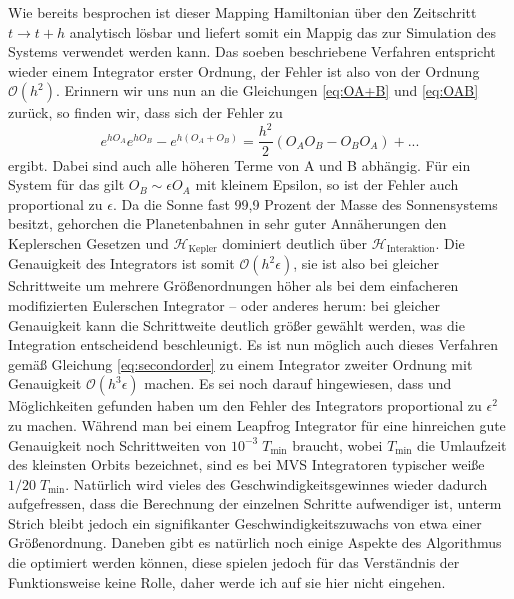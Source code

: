 \documentclass[12pt,a4paper,twoside]{article}
\renewcommand{\cite}{\citep}
\renewcommand{\H}{\mathcal H}
\begin{document}
Wie bereits besprochen ist dieser Mapping Hamiltonian über den Zeitschritt $t \to t+h$ analytisch lösbar und liefert somit ein Mappig das zur Simulation des Systems verwendet werden kann.
Das soeben beschriebene Verfahren entspricht wieder einem Integrator erster Ordnung, der Fehler ist also von der Ordnung $\mathcal{O}(h^2)$.
Erinnern wir uns nun an die Gleichungen \ref{eq:OA+B} und \ref{eq:OAB} zurück, so finden wir, dass sich der Fehler zu
\begin{equation}
e^{hO_A}e^{hO_B}-e^{h\left(O_A+O_B\right)} = \frac{h^2}{2} \left( O_AO_B-O_BO_A \right) + ...
\end{equation}
ergibt. Dabei sind auch alle höheren Terme von A und B abhängig\cite{Chambers1999}. Für ein System für das gilt $O_B\sim\epsilon O_A$ mit kleinem Epsilon, so ist der Fehler auch proportional zu $\epsilon$.
Da die Sonne fast 99,9 Prozent der Masse des Sonnensystems besitzt, %
gehorchen die Planetenbahnen in sehr guter Annäherungen den Keplerschen Gesetzen und $\H_{\mathrm{Kepler}}$ dominiert deutlich über $\H_{\mathrm{Interaktion}}$. Die Genauigkeit des Integrators ist somit $\mathcal{O}(h^2\epsilon)$, sie ist also bei gleicher Schrittweite um mehrere Größenordnungen höher als bei dem einfacheren modifizierten Eulerschen Integrator – oder anderes herum: bei gleicher Genauigkeit kann die Schrittweite deutlich größer gewählt werden, was die Integration entscheidend beschleunigt.
Es ist nun möglich auch dieses Verfahren gemäß Gleichung \ref{eq:secondorder} zu einem Integrator zweiter Ordnung  mit Genauigkeit $\mathcal{O}(h^3\epsilon)$ machen. Es sei noch darauf hingewiesen, dass \cite{Saha1992} und \cite{Wisdom1996} Möglichkeiten gefunden haben um den Fehler des Integrators proportional zu $\epsilon^2$ zu machen.
Während man bei einem Leapfrog Integrator für eine hinreichen gute Genauigkeit noch Schrittweiten von $10^{-3}\;T_{\mathrm{min}}$ braucht, wobei $T_{\mathrm{min}}$ die Umlaufzeit des kleinsten Orbits bezeichnet, sind es bei MVS Integratoren typischer weiße $1/20\;T_{\mathrm{min}}$\cite{Duncan1998}. Natürlich wird vieles des Geschwindigkeitsgewinnes wieder dadurch aufgefressen, dass die Berechnung der einzelnen Schritte aufwendiger ist, unterm Strich bleibt jedoch ein signifikanter Geschwindigkeitszuwachs von etwa einer Größenordnung\cite{Chambers1999}.
Daneben gibt es natürlich noch einige Aspekte des Algorithmus die optimiert werden können, diese spielen jedoch für das Verständnis der Funktionsweise keine Rolle, daher werde ich auf sie hier nicht eingehen.

\end{document}
